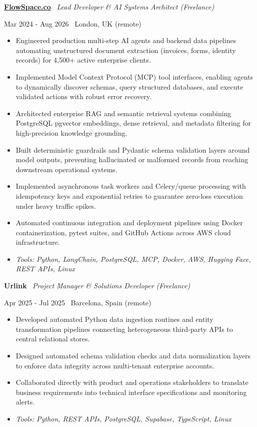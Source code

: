 \documentclass[a4paper,10pt]{article}
\newcommand{\role}[4]{%
 \vspace{2pt}\noindent
 \begin{minipage}[t]{0.70\textwidth}\raggedright\textbf{#1} \textbullet\ \textit{#3}\end{minipage}%
 \hfill
 \begin{minipage}[t]{0.28\textwidth}\raggedleft\footnotesize\color{gray}#2 \textbullet\ #4\end{minipage}%
 \vspace{1pt}%
}
\begin{document}
\role{\href{https://flowspace.co}{FlowSpace.co}}{Mar 2024 - Aug 2026}{Lead Developer \& AI Systems Architect (Freelance)}{London, UK (remote)}
\begin{itemize}
 \item Engineered production multi-step AI agents and backend data pipelines automating unstructured document extraction (invoices, forms, identity records) for 4,500+ active enterprise clients.
 \item Implemented Model Context Protocol (MCP) tool interfaces, enabling agents to dynamically discover schemas, query structured databases, and execute validated actions with robust error recovery.
 \item Architected enterprise RAG and semantic retrieval systems combining PostgreSQL pgvector embeddings, dense retrieval, and metadata filtering for high-precision knowledge grounding.
 \item Built deterministic guardrails and Pydantic schema validation layers around model outputs, preventing hallucinated or malformed records from reaching downstream operational systems.
 \item Implemented asynchronous task workers and Celery/queue processing with idempotency keys and exponential retries to guarantee zero-loss execution under heavy traffic spikes.
 \item Automated continuous integration and deployment pipelines using Docker containerization, pytest suites, and GitHub Actions across AWS cloud infrastructure.
 \item \textit{Tools: Python, LangChain, PostgreSQL, MCP, Docker, AWS, Hugging Face, REST APIs, Linux}
\end{itemize}

\role{Urlink}{Apr 2025 - Jul 2025}{Project Manager \& Solutions Developer (Freelance)}{Barcelona, Spain (remote)}
\begin{itemize}
 \item Developed automated Python data ingestion routines and entity transformation pipelines connecting heterogeneous third-party APIs to central relational stores.
 \item Designed automated schema validation checks and data normalization layers to enforce data integrity across multi-tenant enterprise accounts.
 \item Collaborated directly with product and operations stakeholders to translate business requirements into technical interface specifications and monitoring alerts.
 \item \textit{Tools: Python, REST APIs, PostgreSQL, Supabase, TypeScript, Linux}
\end{itemize}
\end{document}
